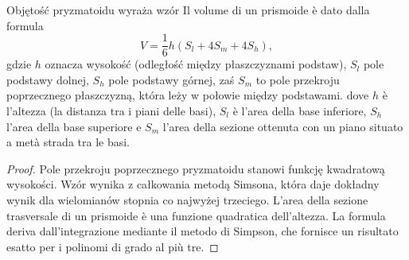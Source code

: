 \begin{proposition}
    Objętość pryzmatoidu wyraża wzór %
    Il volume di un prismoide è dato dalla formula %
    \begin{equation}
        V = \frac 1 6 h (S_l + 4S_m + 4S_h),
    \end{equation}
    gdzie $h$ oznacza wysokość (odległość między płaszczyznami podstaw), $S_l$ pole podstawy dolnej, $S_h$ pole podstawy górnej, zaś $S_m$ to pole przekroju poprzecznego płaszczyzną, która leży w połowie między podstawami. %
    dove $h$ è l'altezza (la distanza tra i piani delle basi), $S_l$ è l'area della base inferiore, $S_h$ l'area della base superiore e $S_m$ l'area della sezione ottenuta con un piano situato a metà strada tra le basi. %
\end{proposition}

\begin{proof}
    Pole przekroju poprzecznego pryzmatoidu stanowi funkcję kwadratową wysokości. %
    Wzór wynika z całkowania metodą Simsona, która daje dokładny wynik dla wielomianów stopnia co najwyżej trzeciego. %
    L'area della sezione trasversale di un prismoide è una funzione quadratica dell'altezza. %
    La formula deriva dall'integrazione mediante il metodo di Simpson, che fornisce un risultato esatto per i polinomi di grado al più tre. %
\end{proof}


%